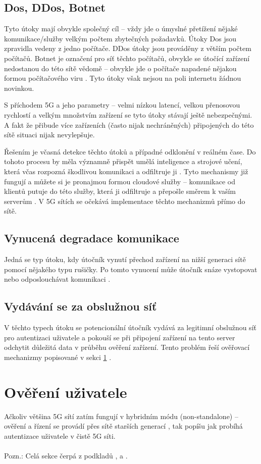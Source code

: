 \subsection{Dos, DDos, Botnet}
Tyto útoky mají obvykle společný cíl -- vždy jde o úmyslné přetížení nějaké komunikace/služby velkým počtem zbytečných požadavků. Útoky Dos jsou zpravidla vedeny z jedno počítače. DDos útoky jsou prováděny z větším počtem počítačů. Botnet je označení pro síť těchto počítačů, obvykle se útočící zařízení nedostanou do této sítě vědomě -- obvykle jde o počítače napadené nějakou formou počítačového viru \cite{Ddos}. Tyto útoky však nejsou na poli internetu žádnou novinkou. 
\par
S příchodem 5G a jeho parametry -- velmi nízkou latencí, velkou přenosovou rychlostí a velkým množstvím zařízení se tyto útoky stávají ještě nebezpečnými. A fakt že přibude více zařízeních (často nijak nechráněných) připojených do této sítě situaci nijak nevylepšuje. 
\par
Řešením je včasná detekce těchto útoků a případné odklonění v reálném čase. Do tohoto procesu by měla významně přispět umělá inteligence a strojové učení, která včas rozpozná škodlivou komunikaci a odfiltruje ji \cite{DdosProtection}. Tyto mechanismy již fungují a můžete si je pronajmou formou cloudové služby -- komunikace od klientů putuje do této služby, která ji odfiltruje a přepošle směrem k vaším serverům \cite{DdosShield}. V 5G sítích se očekává implementace těchto mechanizmů přímo do sítě. 
\subsection{Vynucená degradace komunikace}
Jedná se typ útoku, kdy útočník vynutí přechod zařízení na nižší generaci sítě pomocí nějakého typu rušičky. Po tomto vynucení může útočník snáze vystopovat nebo odposlouchávat komunikaci \cite{KshetriNir20205SaY}.
\subsection{Vydávání se za obslužnou síť }
V těchto typech útoku se potencionální útočník vydává za legitimní obslužnou síť pro autentizaci uživatele a pokouší se při připojení zařízení na tento server odchytit důležitá data v průběhu ověření zařízení. Tento problém řeší ověřovací mechanizmy popisované v sekci \ref{Autentizace} .
\newpage
\section{Ověření uživatele}\label{Autentizace}
Ačkoliv většina 5G sítí zatím fungují v hybridním módu (non-standalone) -- ověření a řízení se provádí přes sítě starších generací \cite{Cetin}, tak popíšu jak probíhá autentizace uživatele v čistě 5G síti. 
\\
\\
Pozn.: Celá sekce čerpá z podkladů \cite{Schwarz}, \cite{autentizace3} a \cite{autentizace2}.
